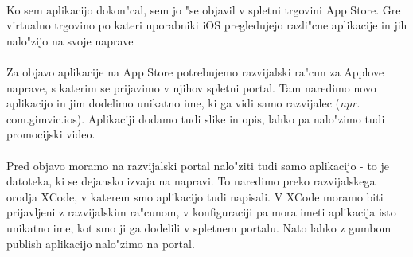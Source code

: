 \paragraph{}Ko sem aplikacijo dokon"cal, sem jo "se objavil v spletni trgovini App Store. Gre virtualno trgovino po kateri uporabniki iOS pregledujejo razli"cne aplikacije in jih nalo"zijo na svoje naprave 

\paragraph{}Za objavo aplikacije na App Store potrebujemo razvijalski ra"cun za Applove naprave, s katerim se prijavimo v njihov spletni portal. Tam naredimo novo aplikacijo in jim dodelimo unikatno ime, ki ga vidi samo razvijalec (\textit{npr.} com.gimvic.ios). Aplikaciji dodamo tudi slike in opis, lahko pa nalo"zimo tudi promocijski video.

\paragraph{}Pred objavo moramo na razvijalski portal nalo"ziti tudi samo aplikacijo - to je datoteka, ki se dejansko izvaja na napravi. To naredimo preko razvijalskega orodja XCode, v katerem smo aplikacijo tudi napisali. V XCode moramo biti prijavljeni z razvijalskim ra"cunom, v konfiguraciji pa mora imeti aplikacija isto unikatno ime, kot smo ji ga dodelili v spletnem portalu. Nato lahko z gumbom publish aplikacijo nalo"zimo na portal.